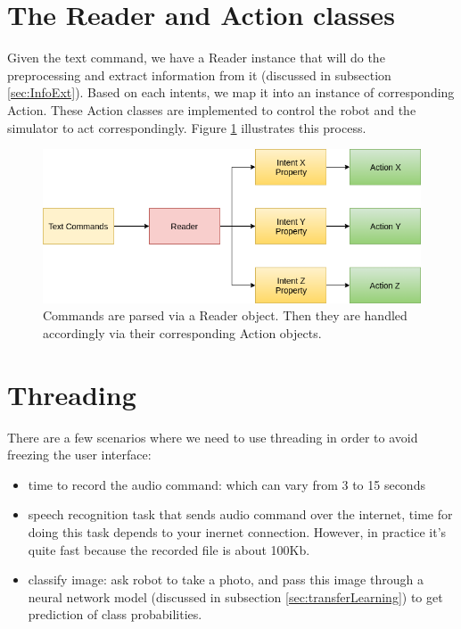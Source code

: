 \section{The Reader and Action classes}
Given the text command, we have a Reader instance that will do the preprocessing and extract information from it (discussed in subsection \ref{sec:InfoExt}). Based on each intents, we map it into an instance of corresponding Action. These Action classes are implemented to control the robot and the simulator to act correspondingly. Figure \ref{fig:readerAction} illustrates this process. 

\begin{figure}[!htb]
	\centering
	\includegraphics[width=0.9\hsize]{./figures/readerAction}
	\caption{Commands are parsed via a Reader object. Then they are handled accordingly via their corresponding Action objects.}
	\label{fig:readerAction}
\end{figure}

\section{Threading}
\label{sec:threading}
There are a few scenarios where we need to use threading in order to avoid freezing the user interface:
\begin{itemize}
	\item time to record the audio command: which can vary from 3 to 15 seconds
	\item speech recognition task that sends audio command over the internet, time for doing this task depends to your inernet connection. However, in practice it's quite fast because the recorded file is about 100Kb.
	\item classify image: ask robot to take a photo, and pass this image through a neural network model (discussed in subsection \ref{sec:transferLearning}) to get prediction of class probabilities.
\end{itemize}

